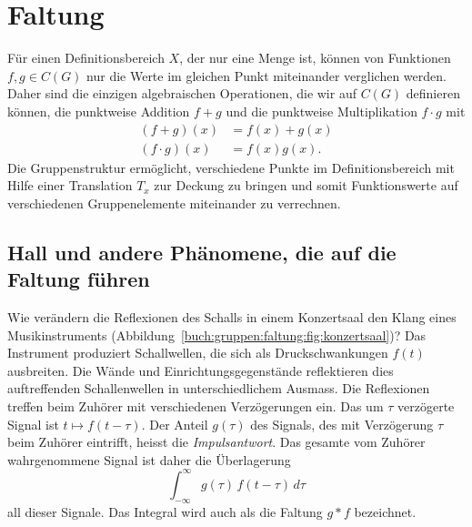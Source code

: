 %
%
%
\section{Faltung
\label{buch:gruppen:section:faltung}}
Für einen Definitionsbereich $X$, der nur eine Menge ist, können
von Funktionen $f,g\in C(G)$ nur die Werte im gleichen Punkt
miteinander verglichen werden. 
Daher sind die einzigen algebraischen Operationen, die wir auf
$C(G)$ definieren können, die punktweise Addition $f+g$ und 
die punktweise Multiplikation $f\cdot g$ mit
\begin{align*}
(f+g)(x)      &= f(x)+g(x) \\
(f\cdot g)(x) &= f(x) g(x).
\end{align*}
Die Gruppenstruktur ermöglicht, verschiedene Punkte im Definitionsbereich
mit Hilfe einer Translation $T_x$ zur Deckung zu bringen und somit
Funktionswerte auf verschiedenen Gruppenelemente miteinander zu verrechnen.

%
% 
\subsection{Hall und andere Phänomene, die auf die Faltung führen
\label{buch:gruppen:faltung:subsection:hall}}

Wie verändern die Reflexionen des Schalls in einem Konzertsaal
den Klang eines Musikinstruments
(Abbildung~\ref{buch:gruppen:faltung:fig:konzertsaal})?
Das Instrument produziert Schallwellen, die sich als Druckschwankungen
$f(t)$ ausbreiten.
Die Wände und Einrichtungsgegenstände reflektieren dies auftreffenden
Schallenwellen in unterschiedlichem Ausmass.
Die Reflexionen treffen beim Zuhörer mit verschiedenen Verzögerungen ein.
Das um $\tau$ verzögerte Signal ist $t\mapsto f(t-\tau)$.
Der Anteil $g(\tau)$ des Signals, des mit Verzögerung $\tau$ beim
Zuhörer eintrifft, heisst die {\em Impulsantwort}.
Das gesamte vom Zuhörer wahrgenommene Signal ist daher die Überlagerung
\begin{equation}
\int_{-\infty}^\infty
g(\tau) 
\,
f(t-\tau)
\,d\tau
\label{buch:gruppen:faltung:eqn:hall}
\end{equation}
all dieser Signale.
Das Integral wird auch als die Faltung $g*f$ bezeichnet.

